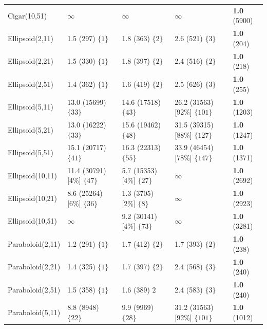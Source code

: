 \documentclass[fontsize=12, a4aper]{scrartcl}
\begin{document}
\begin{table}[H]
\begin{tabularx}{\linewidth}{l l l l l}
			Cigar(10,51) & \(\infty\) & \(\infty\) & \(\infty\) & \textbf{1.0} (5900)\\
			
			Ellipsoid(2,11) & 1.5 (297) \(\{1\}\) & 1.8 (363) \(\{2\}\) & 2.6 (521) \(\{3\}\) & \textbf{1.0} (204)\\
			
			Ellipsoid(2,21) & 1.5 (330) \(\{1\}\) & 1.8 (397) \(\{2\}\) & 2.4 (516) \(\{2\}\) & \textbf{1.0} (218)\\
			
			Ellipsoid(2,51) & 1.4 (362) \(\{1\}\) & 1.6 (419) \(\{2\}\) & 2.5 (626) \(\{3\}\) & \textbf{1.0} (255)\\
			
			Ellipsoid(5,11) & 13.0 (15699) \(\{33\}\) & 14.6 (17518) \(\{43\}\) & 26.2 (31563) [92\%] \(\{101\}\) & \textbf{1.0} (1203)\\
			
			Ellipsoid(5,21) & 13.0 (16222) \(\{33\}\) & 15.6 (19462) \(\{48\}\) & 31.5 (39315) [88\%] \(\{127\}\) & \textbf{1.0} (1247)\\
			
			Ellipsoid(5,51) & 15.1 (20717) \(\{41\}\) & 16.3 (22313) \(\{55\}\) & 33.9 (46454) [78\%] \(\{147\}\) & \textbf{1.0} (1371)\\
			
			Ellipsoid(10,11) & 11.4 (30791) [4\%] \(\{47\}\) & 5.7 (15353) [4\%] \(\{27\}\) & \(\infty\) & \textbf{1.0} (2692)\\
			
			Ellipsoid(10,21) & 8.6 (25264) [6\%] \(\{36\}\) & 1.3 (3705) [2\%] \(\{8\}\) & \(\infty\) & \textbf{1.0} (2923)\\
			
			Ellipsoid(10,51) & \(\infty\) & 9.2 (30141) [4\%] \(\{73\}\) & \(\infty\) & \textbf{1.0} (3281)\\
			
			Paraboloid(2,11) & 1.2 (291) \(\{1\}\) & 1.7 (412) \(\{2\}\) & 1.7 (393) \(\{2\}\) & \textbf{1.0} (238)\\
			
			Paraboloid(2,21) & 1.4 (325) \(\{1\}\) & 1.7 (397) \(\{2\}\) & 2.4 (568) \(\{3\}\) & \textbf{1.0} (240)\\
			
			Paraboloid(2,51) & 1.5 (358) \(\{1\}\) & 1.6 (389) \(2\) & 2.4 (583) \(\{3\}\) & \textbf{1.0} (240)\\
			
			Paraboloid(5,11) & 8.8 (8948) \(\{22\}\) & 9.9 (9969) \(\{28\}\) & 31.2 (31563) [92\%] \(\{101\}\) & \textbf{1.0} (1012)\\
			

\end{tabularx}
\end{table}
\end{document}
